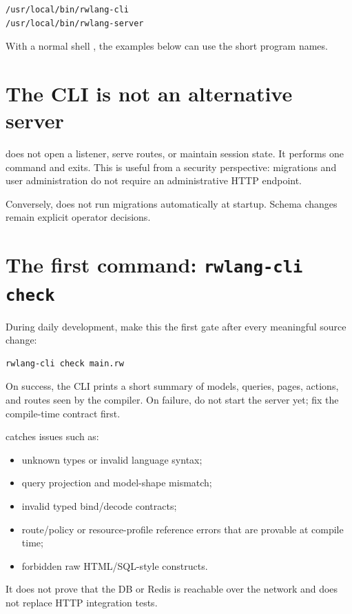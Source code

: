 \begin{lstlisting}
/usr/local/bin/rwlang-cli
/usr/local/bin/rwlang-server
\end{lstlisting}

With a normal shell , the examples below can use the short program names.

\section{The CLI is not an alternative server}

 does not open a listener, serve routes, or maintain session state. It performs one command and exits. This is useful from a security perspective: migrations and user administration do not require an administrative HTTP endpoint.

Conversely,  does not run migrations automatically at startup. Schema changes remain explicit operator decisions.

\section{The first command: \texttt{rwlang-cli check}}

During daily development, make this the first gate after every meaningful source change:

\begin{lstlisting}
rwlang-cli check main.rw
\end{lstlisting}

On success, the CLI prints a short summary of models, queries, pages, actions, and routes seen by the compiler. On failure, do not start the server yet; fix the compile-time contract first.

 catches issues such as:

\begin{itemize}
  \item unknown types or invalid language syntax;
  \item query projection and model-shape mismatch;
  \item invalid typed bind/decode contracts;
  \item route/policy or resource-profile reference errors that are provable at compile time;
  \item forbidden raw HTML/SQL-style constructs.
\end{itemize}

It does not prove that the DB or Redis is reachable over the network and does not replace HTTP integration tests.

